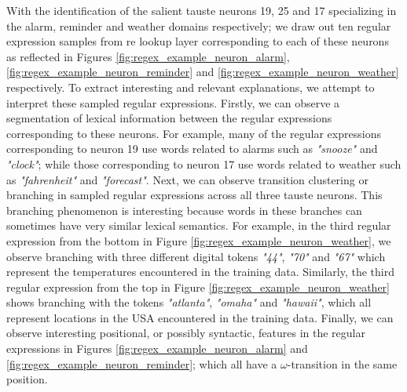 With the identification of the salient \ac{tauste} neurons 19, 25 and 17 specializing
in the alarm, reminder and weather domains respectively; we draw out ten regular
expression samples from \ac{re} lookup layer corresponding to each of these neurons
as reflected in Figures \ref{fig:regex_example_neuron_alarm},
\ref{fig:regex_example_neuron_reminder} and
\ref{fig:regex_example_neuron_weather} respectively. To extract interesting and
relevant explanations, we attempt to interpret these sampled regular
expressions. Firstly, we can observe a segmentation of lexical information
between the regular expressions corresponding to these neurons. For example,
many of the regular expressions corresponding to neuron 19 use words related to
alarms such as \textit{"snooze"} and \textit{"clock"}; while those corresponding to neuron 17 use
words related to weather such as \textit{"fahrenheit"} and \textit{"forecast"}. Next, we can
observe transition clustering or branching in sampled regular expressions across
all three \ac{tauste} neurons. This branching phenomenon is interesting because words
in these branches can sometimes have very similar lexical semantics. For
example, in the third regular expression from the bottom in Figure
\ref{fig:regex_example_neuron_weather}, we observe branching with three
different digital tokens \textit{"44"}, \textit{"70"} and \textit{"67"} which
represent the temperatures encountered in the training data. Similarly, the
third regular expression from the top in Figure
\ref{fig:regex_example_neuron_weather} shows branching with the tokens
\textit{"atlanta"}, \textit{"omaha"} and \textit{"hawaii"}, which all represent
locations in the USA encountered in the training data. Finally, we can observe
interesting positional, or possibly syntactic, features in the regular
expressions in Figures \ref{fig:regex_example_neuron_alarm} and
\ref{fig:regex_example_neuron_reminder}; which all have a $\omega$-transition in
the same position.

